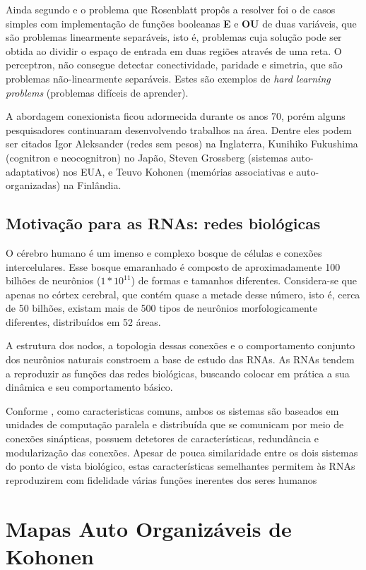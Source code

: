 \documentclass[
	12pt,				%
	openright,			%
	twoside,			%
	a4paper,			%
	english,			%
	french,				%
	spanish,			%
	brazil				%
	]{abntex2}
\begin{document}
Ainda segundo  e  o problema que Rosenblatt propôs a resolver foi o de casos simples com implementação de funções booleanas \textbf{E} e \textbf{OU} de duas variáveis, que são problemas linearmente separáveis, isto é, problemas cuja solução pode ser obtida ao dividir o espaço de entrada em duas regiões através de uma reta. O perceptron, não consegue detectar conectividade, paridade e simetria, que são problemas não-linearmente separáveis. Estes são exemplos de \textit{hard learning problems} (problemas difíceis de aprender).

A abordagem conexionista ficou adormecida durante os anos 70, porém alguns pesquisadores continuaram desenvolvendo trabalhos na área. Dentre eles podem ser citados Igor Aleksander (redes sem pesos) na Inglaterra, Kunihiko Fukushima (cognitron e neocognitron) no Japão, Steven Grossberg (sistemas auto-adaptativos) nos EUA, e Teuvo Kohonen (memórias associativas e auto-organizadas) na Finlândia.
\subsection{Motivação para as RNAs: redes biológicas}
O cérebro humano é um imenso e complexo bosque de células e conexões intercelulares. Esse bosque emaranhado é composto de aproximadamente 100 bilhões de neurônios ($ 1 * 10^{11}$) de formas e tamanhos diferentes. Considera-se que apenas no córtex cerebral, que contém quase a metade desse número, isto é, cerca de 50 bilhões, existam mais de 500 tipos de neurônios morfologicamente diferentes, distribuídos em 52 áreas.\cite[p.18]{mora2016continuum} 

A estrutura dos nodos, a topologia dessas conexões e o comportamento conjunto dos neurônios naturais constroem a base de estudo das RNAs. As RNAs tendem a reproduzir as funções das redes biológicas, buscando colocar em prática a sua dinâmica e seu comportamento básico. 

Conforme , como caracteristicas comuns, ambos os sistemas são baseados em unidades de computação paralela e distribuída que se comunicam por meio de conexões sinápticas, possuem detetores de características, redundância e modularização das conexões. Apesar de pouca similaridade entre os dois sistemas do ponto de vista biológico, estas características semelhantes permitem às RNAs reproduzirem com fidelidade várias funções inerentes dos seres humanos
\section{Mapas Auto Organizáveis de Kohonen}
\end{document}
